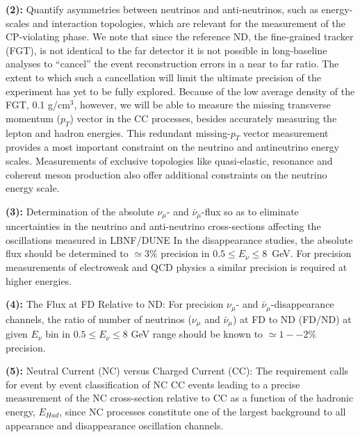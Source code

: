\vspace{0.25cm} 
\noindent
{\bf (2):} Quantify asymmetries between neutrinos and anti-neutrinos, such as 
energy-scales and interaction topologies, which are relevant for the measurement of the CP-violating phase. 
We note that since the 
%
% 
reference ND, the fine-grained tracker (FGT),  
%
is not identical to the far
 detector it is not possible in long-baseline analyses to ``cancel'' the event reconstruction
 errors in a near to far ratio. %
The extent to which such a cancellation will limit the ultimate precision of the experiment has yet to
 be fully explored. 
Because of the low average density of the FGT, 0.1 g/cm$^3$, however, we will be able to 
measure the missing transverse momentum ($p_{T}$)  vector in the CC processes, besides accurately 
measuring the lepton and hadron energies.
This redundant missing-$p_{T}$ vector measurement provides a most important
constraint on the neutrino and antineutrino energy scales. Measurements of
exclusive topologies like quasi-elastic, resonance and
coherent meson production also offer additional constraints on the neutrino energy scale. 



\vspace{0.25cm} 
\noindent
{\bf (3):} Determination of the absolute $\nu_\mu$- and $\bar \nu_\mu$-flux so as to  eliminate uncertainties in the neutrino and anti-neutrino cross-sections 
affecting the oscillations measured  in LBNF/DUNE In the  disappearance 
studies, the absolute flux should be determined to $\simeq 3\%$ precision in 
$0.5 \leq E_\nu \leq 8$~GeV. For precision measurements of electroweak 
and QCD physics a similar precision is required at higher energies. 

\vspace{0.25cm} 
\noindent
{\bf (4):} The  Flux at FD Relative to ND: For precision $\nu_\mu$- and $\bar \nu_\mu$-disappearance  
channels, the ratio of number of neutrinos ($\nu_\mu$  and $\bar \nu_\mu$) at FD to ND (FD/ND) 
at given $E_\nu$ bin in $0.5 \leq E_\nu \leq 8$ GeV range should be known
%
% 
to $\simeq 1--2\%$ precision. 

\vspace{0.25cm} 
\noindent
{\bf (5):} Neutral Current (NC) versus Charged Current (CC): 
The requirement calls for event by event classification of NC  
CC events leading to a precise measurement of 
the NC cross-section relative to 
CC as a function of the hadronic energy, $E_{Had}$, since NC processes 
constitute one of the largest background to all appearance and disappearance oscillation 
channels.

